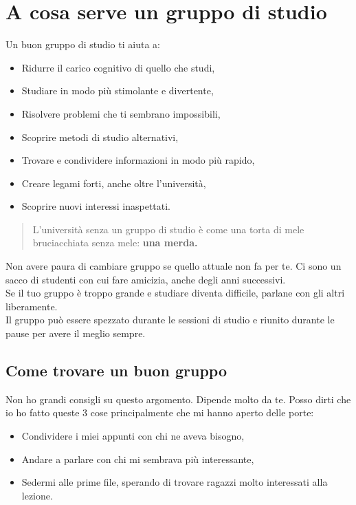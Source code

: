 \documentclass[18pt]{extarticle}
\begin{document}
\section{A cosa serve un gruppo di studio}
Un buon gruppo di studio ti aiuta a:
\begin{itemize}
\item Ridurre il carico cognitivo di quello che studi,
\item Studiare in modo più stimolante e divertente,
\item Risolvere problemi che ti sembrano impossibili,
\item Scoprire metodi di studio alternativi,
\item Trovare e condividere informazioni in modo più rapido,
\item Creare legami forti, anche oltre l'università,
\item Scoprire nuovi interessi inaspettati.
\end{itemize}
\begin{quote}
L'università senza un gruppo di studio è come una torta di mele bruciacchiata senza mele: \textbf{una merda.}
\end{quote}
Non avere paura di cambiare gruppo se quello attuale non fa per te. Ci sono un sacco di studenti con cui fare amicizia, anche degli anni successivi.\\
Se il tuo gruppo è troppo grande e studiare diventa difficile, parlane con gli altri liberamente.\\
Il gruppo può essere spezzato durante le sessioni di studio e riunito durante le pause per avere il meglio sempre.


\subsection{Come trovare un buon gruppo}
Non ho grandi consigli su questo argomento. Dipende molto da te.
Posso dirti che io ho fatto queste 3 cose principalmente che mi hanno aperto delle porte:
\begin{itemize}
\item Condividere i miei appunti con chi ne aveva bisogno, 
\item Andare a parlare con chi mi sembrava più interessante,
\item Sedermi alle prime file, sperando di trovare ragazzi molto interessati alla lezione.
\end{itemize}

\clearpage
\end{document}
